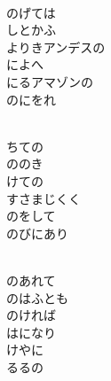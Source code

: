 \documentclass[10pt,b5j]{tarticle} %
\begin{document}
\begin{enumerate}
\begin{minipage}[c]{\blocksize}
        \vspace{\linespace}
        \item~\\
        のげては\\
        しとかふ\\
        よりきアンデスの\\
        によへ\\
        にるアマゾンの\\
        のにをれ
        
        \vspace{\linespace}
        \item~\\
        ちての\\
        ののき\\
        けての\\
        すさまじくく\\
        のをして\\
        のびにあり
        
        \vspace{\linespace}
        \item~\\
        のあれて\\
        のはふとも\\
        のければ\\
        はになり\\
        けやに\\
        るるの
    
    \end{minipage}
\end{enumerate} %
\end{document}
